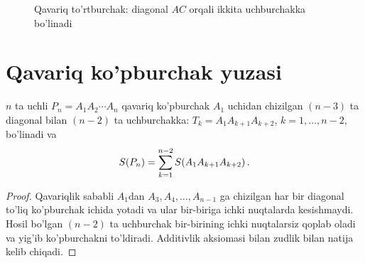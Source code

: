 \begin{figure}[h]
\centering
{}
\caption{Qavariq to'rtburchak: diagonal $AC$ orqali ikkita uchburchakka bo'linadi}
\label{fig:convex_quad}
\end{figure}

\section{Qavariq ko'pburchak yuzasi}
\label{sec:polygon}

\begin{teorema}
\label{thm:polygon}
$n$ ta uchli $P_n = A_1 A_2 \cdots A_n$ qavariq ko'pburchak $A_1$ uchidan
chizilgan $(n-3)$ ta diagonal bilan $(n-2)$ ta uchburchakka:
$T_k = A_1 A_{k+1} A_{k+2}$, $k=1,\ldots,n-2$, bo'linadi va
\[
  S\!\left(P_n\right) = \sum_{k=1}^{n-2} S\!\left(A_1 A_{k+1} A_{k+2}\right).
\]
\end{teorema}
\begin{proof}
Qavariqlik sababli $A_1$dan $A_3, A_4, \ldots, A_{n-1}$ ga chizilgan har bir
diagonal to'liq ko'pburchak ichida yotadi va ular bir-biriga ichki nuqtalarda
kesishmaydi.
Hosil bo'lgan $(n-2)$ ta uchburchak bir-birining ichki nuqtalarsiz qoplab oladi
va yig'ib ko'pburchakni to'ldiradi. Additivlik aksiomasi bilan zudlik bilan
natija kelib chiqadi. \qedhere
\end{proof}

